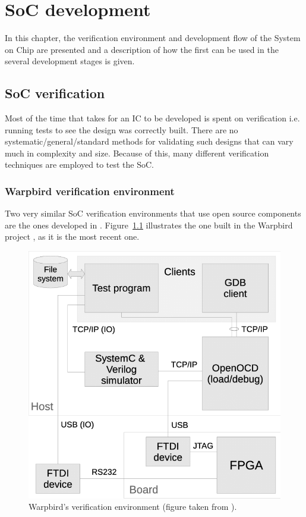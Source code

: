 
\chapter{SoC development}
\label{chapter:environment}

In this chapter, the verification environment and development flow of the \socname System on Chip are presented and a description of how the first can be used in the several development stages is given.

\section{SoC verification}
\label{section:verification_env}
Most of the time that takes for an IC to be developed is spent on verification i.e. running tests to see the design was correctly built. There are no systematic/general/standard methods for validating such designs that can vary much in complexity and size. Because of this, many different verification techniques are employed to test the SoC. 

\subsection{Warpbird verification environment}
Two very similar SoC verification environments that use open source components are the ones developed in \cite{bib:blackbird,bib:warpbird}. Figure~\ref{fig:env_warpbird} illustrates the one built in the Warpbird project \cite{bib:warpbird}, as it is the most recent one.

\begin{figure}[!h]
	\centering
	\includegraphics[width=0.5\linewidth]{Figures/env_warpbird}
	\caption{Warpbird's verification environment (figure taken from \cite{bib:warpbird}).}
	\label{fig:env_warpbird}
\end{figure}

